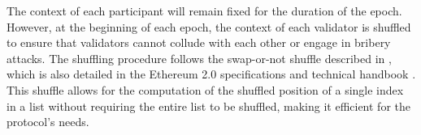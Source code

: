 The context of each participant will remain fixed for the duration of the epoch. However, at the beginning of each epoch, the context of each validator is shuffled to ensure that validators cannot collude with each other or engage in bribery attacks.
The shuffling procedure follows the swap-or-not shuffle described in \cite{HMR12}, which is also detailed in the Ethereum 2.0 specifications and technical handbook \cite{Edg25}. This shuffle allows for the computation of the shuffled position of a single index in a list without requiring the entire list to be shuffled, making it efficient for the protocol's needs.
% 





